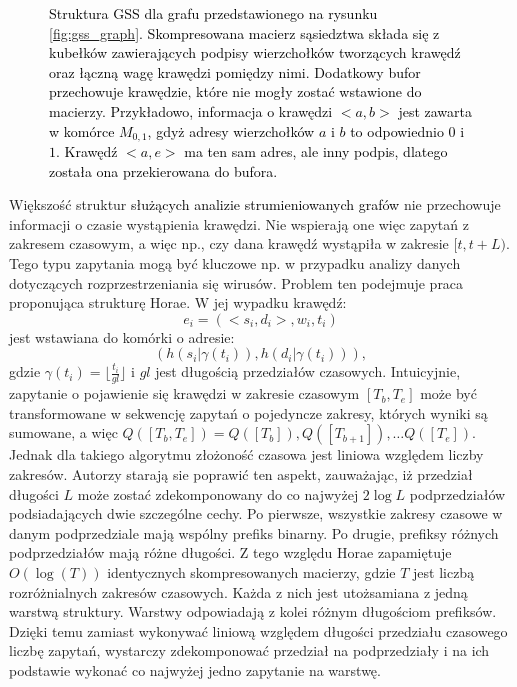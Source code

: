 \begin{figure}[htb]
\begin{tikzpicture}[scale=0.8, every node/.style={scale=0.8},legend node/.style={minimum height=5mm, minimum width=5mm, draw},
                legend text/.style={right}]
    \end{tikzpicture}
            \caption{\textcolor{black}{Struktura GSS dla grafu przedstawionego na rysunku \ref{fig:gss_graph}. Skompresowana macierz sąsiedztwa składa się z kubełków zawierających podpisy wierzchołków tworzących krawędź oraz łączną wagę krawędzi pomiędzy nimi. Dodatkowy bufor przechowuje krawędzie, które nie mogły zostać wstawione do macierzy. Przykładowo, informacja o krawędzi $<a,b>$ jest zawarta w komórce $M_{0,1}$, gdyż adresy wierzchołków $a$ i $b$ to odpowiednio $0$ i $1$. Krawędź $<a,e>$ ma ten sam adres, ale inny podpis, dlatego została ona przekierowana do bufora.}}
    \label{fig:gss_structure}
    \end{figure}

    Większość struktur \textcolor{black}{służących analizie strumieniowanych grafów} nie przechowuje informacji o czasie wystąpienia krawędzi. Nie wspierają one więc zapytań z zakresem czasowym, a więc np., czy dana krawędź wystąpiła w zakresie $[t, t + L)$. Tego typu zapytania mogą być kluczowe np. w przypadku analizy danych dotyczących rozprzestrzeniania się wirusów. Problem ten podejmuje praca proponująca strukturę Horae\cite{Chen_Zhou_Chen_Xiao_Jin_Li_2022}. W jej wypadku krawędź:
    \[
        e_i = (<s_i, d_i>, w_i, t_i)
    \] jest wstawiana do komórki o adresie: 
    \[
        (h(s_i | \gamma(t_i)), h(d_i | \gamma(t_i))),
    \]
    gdzie $\gamma(t_i) = \lfloor \frac{t_i}{gl} \rfloor$ i $gl$ jest długością przedziałów czasowych. Intuicyjnie, zapytanie o pojawienie się krawędzi w zakresie czasowym $[T_b, T_e]$ może być transformowane w sekwencję zapytań o pojedyncze zakresy, których wyniki są sumowane, a więc $Q([T_b, T_e]) = Q([T_b]), Q([T_{b+1}]), \dots Q([T_e])$. Jednak dla takiego algorytmu złożoność czasowa jest liniowa względem liczby zakresów. Autorzy starają sie poprawić ten aspekt, zauważając, iż przedział długości $L$ może zostać zdekomponowany do co najwyżej $2\log{L}$ podprzedziałów podsiadających dwie szczególne cechy. Po pierwsze, wszystkie zakresy czasowe w danym podprzedziale mają wspólny prefiks binarny. Po drugie, prefiksy różnych podprzedziałów mają różne długości. Z tego względu Horae zapamiętuje $O(\log(T))$ identycznych skompresowanych macierzy, gdzie $T$ jest liczbą rozróżnialnych zakresów czasowych. Każda z nich jest utożsamiana z jedną warstwą struktury. Warstwy odpowiadają z kolei różnym długościom prefiksów. Dzięki temu zamiast wykonywać liniową względem długości przedziału czasowego liczbę zapytań, wystarczy zdekomponować przedział na podprzedziały i na ich podstawie wykonać co najwyżej jedno zapytanie na warstwę. 
    
